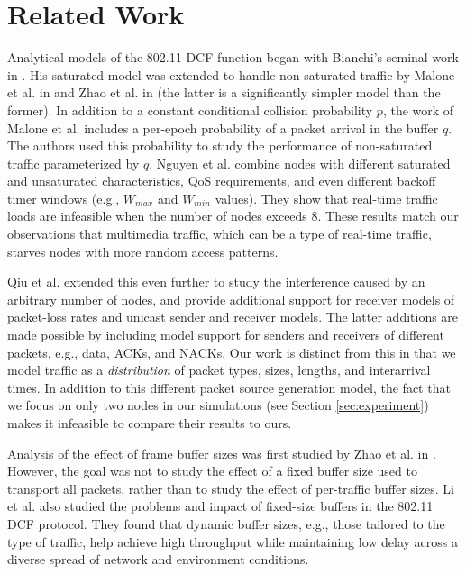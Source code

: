 \documentclass{llncs}
\begin{document}
\section{Related Work}
Analytical models of the 802.11 DCF function began with Bianchi's seminal work in \cite{bianchi1996performance}. His saturated model was extended to handle non-saturated traffic by Malone et al. in \cite{dcf-nonsaturated} and Zhao et al. in \cite{zhao2009simple} (the latter is a significantly simpler model than the former). In addition to a constant conditional collision probability $p$, the work of Malone et al. includes a per-epoch probability of a packet arrival in the buffer $q$. The authors used this probability to study the performance of non-saturated traffic parameterized by $q$. Nguyen et al. \cite{nguyen2012performance} combine nodes with different saturated and unsaturated characteristics, QoS requirements, and even different backoff timer windows (e.g., $W_{max}$ and $W_{min}$ values). They show that real-time traffic loads are infeasible when the number of nodes exceeds $8$. These results match our observations that multimedia traffic, which can be a type of real-time traffic, starves nodes with more random access patterns.

Qiu et al. \cite{qiu2007general} extended this even further to study the interference caused by an arbitrary number of nodes, and provide additional support for receiver models of packet-loss rates and unicast sender and receiver models. The latter additions are made possible by including model support for senders and receivers of different packets, e.g., data, ACKs, and NACKs. Our work is distinct from this in that we model traffic as a \emph{distribution} of packet types, sizes, lengths, and interarrival times. In addition to this different packet source generation model, the fact that we focus on only two nodes in our simulations (see Section \ref{sec:experiment}) makes it infeasible to compare their results to ours. 

Analysis of the effect of frame buffer sizes was first studied by Zhao et al. in \cite{zhao2011modeling}. However, the goal was not to study the effect of a fixed buffer size used to transport all packets, rather than to study the effect of per-traffic buffer sizes. Li et al. \cite{li2011buffer} also studied the problems and impact of fixed-size buffers in the 802.11 DCF protocol. They found that dynamic buffer sizes, e.g., those tailored to the type of traffic, help achieve high throughput while maintaining low delay across a diverse spread of network and environment conditions. 
\end{document}
